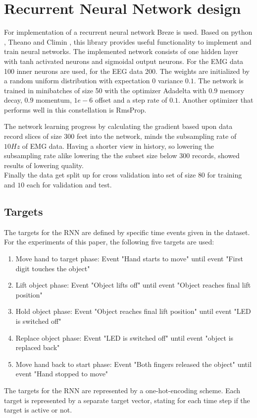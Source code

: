 \documentclass{article} %
\begin{document}
\section{Recurrent Neural Network design}
For implementation of a recurrent neural network Breze \cite{breze} is used. Based on python \cite{python}, Theano \cite{theano} and Climin \cite{climin}, this library provides useful functionality to implement and train neural networks. The implemented network consists of one hidden layer with tanh activated neurons and sigmoidal output neurons. For the EMG data 100 inner neurons are used, for the EEG data 200. The weights are initialized by a random uniform distribution with  expectation $0$ variance $0.1$. The network is trained in minibatches of size 50 with the optimizer Adadelta with $0.9$ memory decay, $0.9$ momentum, $1e-6$ offset and a step rate of $0.1$. Another optimizer that performs well in this constellation is RmsProp.

The network learning progress by calculating the gradient based upon data record slices of size $300$ feet into the network, minds the subsampling rate of $10Hz$ of EMG data. Having a shorter view in history, so lowering the subsampling rate alike lowering the the subset size below $300$ records, showed results of lowering quality.\\

Finally the data get split up for cross validation into set of size $80$ for training and $10$ each for validation and test.\\



\subsection{Targets}
The targets for the RNN are defined by specific time events given in the dataset. For the experiments of this paper, the following five targets are used:
\begin{enumerate}
	\item Move hand to target phase: Event "Hand starts to move"  until event "First digit touches the object"
	\item Lift object phase: Event "Object lifts off" until event "Object reaches final lift position"
	\item Hold object phase: Event "Object reaches final lift position" until event "LED is switched off"
	\item Replace object phase: Event "LED is switched off" until event "object is replaced back"
	\item Move hand back to start phase: Event "Both fingers released the object" until event "Hand stopped to move"
\end{enumerate}
The targets for the RNN are represented by a one-hot-encoding scheme. Each target is represented by a separate target vector, stating for each time step if the target is active or not.
\end{document}

